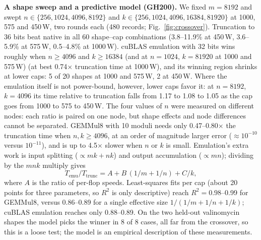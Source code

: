 \documentclass[conference]{IEEEtran}
\newcommand{\W}{\,W}
\newcommand{\pct}{\%}
\begin{document}
\textbf{A shape sweep and a predictive model (GH200).} We fixed $m=8192$ and swept $n\in\{256,1024,4096,8192\}$ and
$k\in\{256,1024,4096,16384,81920\}$ at 1000, 575 and 450\W, two rounds each (480 records; Fig.~\ref{fig:crossover}).
Truncation to 36 bits beat native in all 60 shape--cap combinations (3.8--11.9\pct{} at 450\W, 3.6--5.9\pct{} at
575\W, 0.5--4.8\pct{} at 1000\W). cuBLAS emulation with 32 bits wins roughly when $n\ge4096$ and $k\ge16384$ (and at
$n=1024$, $k=81920$ at 1000 and 575\W) (at best 0.74$\times$ truncation time at 1000\W), and its winning region shrinks at
lower caps: 5 of 20 shapes at 1000 and 575\W, 2 at 450\W. Where the emulation itself is not power-bound, however, lower
caps favor it: at $n=8192$, $k=4096$ its time relative to truncation falls from 1.17 to 1.08 to 1.05 as the cap goes from
1000 to 575 to 450\W. The four values of $n$ were measured on different nodes: each ratio is paired on one node, but
shape effects and node differences cannot be separated. GEMMul8 with 10 moduli needs only 0.47--0.80$\times$ the
truncation time when $n,k\ge4096$, at an order of magnitude larger error ($\approx10^{-10}$ versus $10^{-11}$), and is up
to 4.5$\times$ slower when $n$ or $k$ is small. Emulation's extra work is input splitting ($\propto mk+nk$) and output
accumulation ($\propto mn$); dividing by the $mnk$ multiply gives
\begin{equation}
T_\mathrm{emu}/T_\mathrm{trunc} = A + B\,(1/m + 1/n) + C/k,
\end{equation}
where $A$ is the ratio of per-flop speeds. Least-squares fits per cap (about 20 points for three parameters, so $R^2$ is
only descriptive) reach $R^2=0.98$--0.99 for GEMMul8, versus 0.86--0.89 for a single effective size
$1/(1/m+1/n+1/k)$; cuBLAS emulation reaches only 0.88--0.89. On the two held-out valinomycin shapes the model picks the
winner in 8 of 8 cases, all far from the crossover, so this is a loose test; the model is an empirical description of
these measurements.
\end{document}
